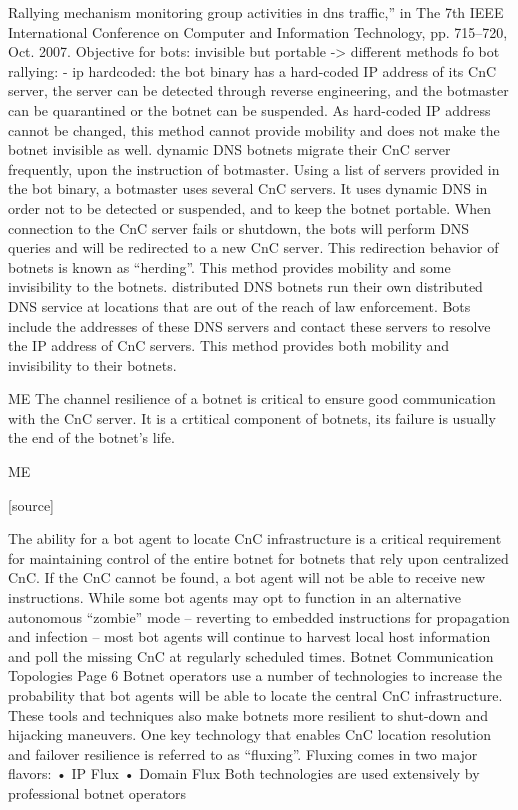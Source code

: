 Rallying mechanism %
monitoring group activities in dns traffic,” in The 7th IEEE International Conference on Computer
and Information Technology, pp. 715–720, Oct. 2007.
Objective for bots: invisible but portable -> different methods fo bot rallying: - ip hardcoded: the bot
binary has a hard-coded IP address of its CnC server, the server can be detected through reverse
engineering, and the botmaster can be quarantined or the botnet can be suspended. As hard-coded
IP address cannot be changed, this method cannot provide mobility and does not make the botnet
invisible as well.
dynamic DNS %
botnets migrate their CnC server frequently, upon the instruction of botmaster. Using a list of
servers provided in the bot binary, a botmaster uses several CnC servers. It uses dynamic DNS in
order not to be detected or suspended, and to keep the botnet portable. When connection to the
CnC server fails or shutdown, the bots will perform DNS queries and will be redirected to a new
CnC server. This redirection behavior of botnets is known as “herding”. This method provides
mobility and some invisibility to the botnets.
distributed DNS 
botnets run their own distributed DNS service at locations that are out of the reach of law
enforcement. Bots include the addresses of these DNS servers and contact these servers to resolve
the IP address of CnC servers. This method provides both mobility and invisibility to their botnets.

ME
The channel resilience of a botnet is critical to ensure good communication with the CnC server. It is a crtitical component of botnets, its failure is usually the end of the botnet's life. 



ME


[source]

The ability for a bot agent to locate CnC infrastructure is a critical requirement for
maintaining control of the entire botnet for botnets that rely upon centralized CnC. If
the CnC cannot be found, a bot agent will not be able to receive new instructions.
While some bot agents may opt to function in an alternative autonomous “zombie”
mode – reverting to embedded instructions for propagation and infection – most bot
agents will continue to harvest local host information and poll the missing CnC at
regularly scheduled times.
Botnet Communication Topologies
Page 6
Botnet operators use a number of technologies to increase the probability that bot
agents will be able to locate the central CnC infrastructure. These tools and techniques
also make botnets more resilient to shut-down and hijacking maneuvers.
One key technology that enables CnC location resolution and failover resilience is
referred to as “fluxing”. Fluxing comes in two major flavors:
• IP Flux
• Domain Flux
Both technologies are used extensively by professional botnet operators


